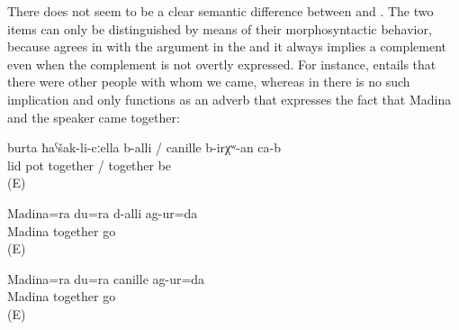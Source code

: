 There does not seem to be a clear semantic difference between  and  . The two items can only be distinguished by means of their morphosyntactic behavior, because  agrees in  with the argument in the   and it always implies a complement even when the complement is not overtly expressed. For instance,  entails that there were other people with whom we came, whereas in  there is no such implication and  only functions as an adverb that expresses the fact that Madina and the speaker came together:
%
\begin{exe}
	\ex	\label{ex:‎The lid should be together with the pot}
	\gll	burta	ħaˁšak-li-cːella	b-alli	/	canille	b-irχʷ-an	ca-b\\
		lid	pot	together	/	together	be	\\
	\glt	{} (E)

	\ex	\label{ex:‎Madina and I came together (with somebody else / with other people)}
	\gll	Madina=ra	du=ra	d-alli	ag-ur=da\\
		Madina		together	go\\
	\glt	{} (E)

	\ex	\label{ex:‎Madina and I came together}
	\gll	Madina=ra	du=ra	canille	ag-ur=da\\
		Madina		together	go\\
	\glt	{} (E)
\end{exe}

